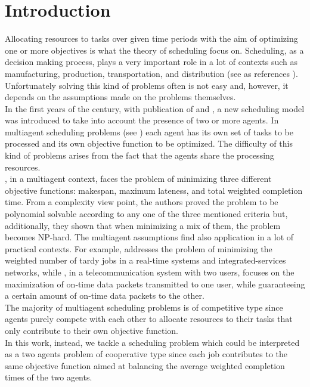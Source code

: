\documentclass[opre,nonblindrev]{informs3} %
\begin{document}
\section{Introduction}
Allocating resources to tasks over given time periods with the aim of optimizing one or more objectives is what the theory of scheduling focus on. Scheduling, as a decision making process, plays a very important role in a lot of contexts such as manufacturing, production, transportation, and distribution (see as references \cite{pinedo09,pinedo16}). Unfortunately solving this kind of problems often is not easy and, however, it depends on the assumptions made on the problems themselves.\\
In the first years of the century, with publication of \cite{agnetis04} and \cite{baker2003}, a new scheduling model was introduced to take into account the presence of two or more agents. In multiagent scheduling problems (see \cite{agnetis-book14}) each agent has its own set of tasks to be processed and its own objective function to be optimized. The difficulty of this kind of problems arises from the fact that the agents share the processing resources.\\
\cite{baker2003}, in a multiagent context, faces the problem of minimizing three different objective functions: makespan, maximum lateness, and total weighted completion time. From a complexity view point, the authors proved the problem to be polynomial solvable according to any one of the three mentioned criteria but, additionally, they shown that when minimizing a mix of them, the problem becomes NP-hard. 
The multiagent assumptions find also application in a lot of practical contexts. For example, \cite{Peha95} addresses the problem of minimizing the weighted number of tardy jobs in a real-time systems and integrated-services networks, while \cite{Arbib04}, in a  telecommunication system with two users, focuses on the maximization of on‐time data packets transmitted to one user, while guaranteeing a certain amount of on‐time data packets to the other.\\
 The majority of multiagent scheduling problems is of competitive type since agents purely compete with each other to allocate resources to their tasks that only contribute to their own objective function.\\ In this work, instead, we tackle a scheduling problem which could be interpreted as a two agents problem of cooperative type since each job contributes to the same objective function aimed at balancing the average weighted completion times of the two agents.\\
\end{document}
